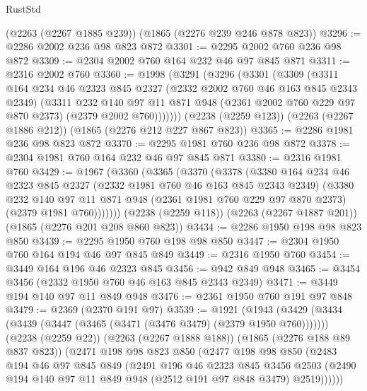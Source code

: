 \begin{lexlean}{RustStd}
\begin{coremodule}
    (@2263 (@2267 @1885 @239))
    (@1865 (@2276 @239 @246 @878 @823))
@3296 := @2286 @2002 @236 @98 @823 @872
@3301 := @2295 @2002 @760 @236 @98 @872
@3309 := @2304 @2002 @760 @164 @232 @46 @97 @845 @871
@3311 := @2316 @2002 @760
@3360 := @1998
    (@3291
      (@3296
        (@3301
          (@3309
            (@3311
              @164
              @234
              @46
              @2323
              @845
              @2327
              (@2332 @2002 @760 @46 @163 @845 @2343 @2349)
              (@3311
                @232
                @140
                @97
                @11
                @871
                @948
                (@2361 @2002 @760 @229 @97 @870 @2373)
                (@2379 @2002 @760)))))))
    (@2238 (@2259 @123))
    (@2263 (@2267 @1886 @212))
    (@1865 (@2276 @212 @227 @867 @823))
@3365 := @2286 @1981 @236 @98 @823 @872
@3370 := @2295 @1981 @760 @236 @98 @872
@3378 := @2304 @1981 @760 @164 @232 @46 @97 @845 @871
@3380 := @2316 @1981 @760
@3429 := @1967
    (@3360
      (@3365
        (@3370
          (@3378
            (@3380
              @164
              @234
              @46
              @2323
              @845
              @2327
              (@2332 @1981 @760 @46 @163 @845 @2343 @2349)
              (@3380
                @232
                @140
                @97
                @11
                @871
                @948
                (@2361 @1981 @760 @229 @97 @870 @2373)
                (@2379 @1981 @760)))))))
    (@2238 (@2259 @118))
    (@2263 (@2267 @1887 @201))
    (@1865 (@2276 @201 @208 @860 @823))
@3434 := @2286 @1950 @198 @98 @823 @850
@3439 := @2295 @1950 @760 @198 @98 @850
@3447 := @2304 @1950 @760 @164 @194 @46 @97 @845 @849
@3449 := @2316 @1950 @760
@3454 := @3449 @164 @196 @46 @2323 @845
@3456 := @942 @849 @948
@3465 := @3454 @3456 (@2332 @1950 @760 @46 @163 @845 @2343 @2349)
@3471 := @3449 @194 @140 @97 @11 @849 @948
@3476 := @2361 @1950 @760 @191 @97 @848
@3479 := @2369 (@2370 @191 @97)
@3539 := @1921
    (@1943
      (@3429 (@3434 (@3439 (@3447 (@3465 (@3471 (@3476 @3479) (@2379 @1950 @760)))))))
      (@2238 (@2259 @22))
      (@2263 (@2267 @1888 @188))
      (@1865 (@2276 @188 @89 @837 @823))
      (@2471
        @198
        @98
        @823
        @850
        (@2477
          @198
          @98
          @850
          (@2483
            @194
            @46
            @97
            @845
            @849
            (@2491
              @196
              @46
              @2323
              @845
              @3456
              @2503
              (@2490 @194 @140 @97 @11 @849 @948 (@2512 @191 @97 @848 @3479) @2519))))))

\end{coremodule}
\end{lexlean}
